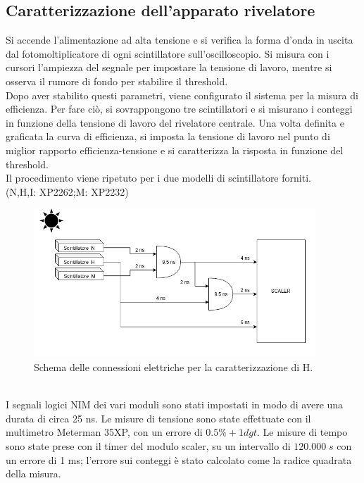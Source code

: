\documentclass[11pt]{article} %
\begin{document}
\subsection{Caratterizzazione dell'apparato rivelatore}
Si accende l'alimentazione ad alta tensione e si verifica la forma d'onda in uscita dal fotomoltiplicatore di ogni scintillatore sull'oscilloscopio. Si misura con i cursori l'ampiezza del segnale per impostare la tensione di lavoro, mentre si osserva il rumore di fondo per stabilire il threshold.  \\ Dopo aver stabilito questi parametri, viene configurato il sistema per la misura di efficienza. Per fare ciò, si sovrappongono tre scintillatori e si misurano i conteggi in funzione della tensione di lavoro del rivelatore centrale. Una volta definita e graficata la curva di efficienza, si imposta la tensione di lavoro nel punto di miglior rapporto efficienza-tensione e si caratterizza la risposta in funzione del threshold. \\Il procedimento viene ripetuto per i due modelli di scintillatore forniti.\\
(N,H,I: XP2262;M: XP2232)\\
\begin{figure}[h!]
\begin{center}
\includegraphics[width=400px]{img/conn_3.png}
\caption{Schema delle connessioni elettriche per la caratterizzazione di H.}
\label{fig:con_3}
\end{center}
\end{figure}\\
I segnali logici NIM dei vari moduli sono stati impostati in modo di avere una durata di circa 25 ns. Le misure di tensione sono state effettuate con il multimetro Meterman 35XP, con un errore di $0.5\%+1dgt$. Le misure di tempo sono state prese con il timer del modulo scaler, su un intervallo di $120.000\;s$ con un errore di 1 ms; l'errore sui conteggi è stato calcolato come la radice quadrata della misura.\\ 
\end{document}
